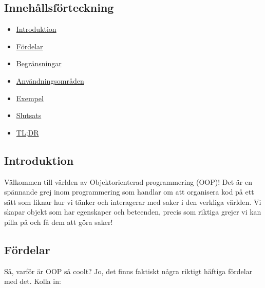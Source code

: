 \hypertarget{innehuxe5llsfuxf6rteckning}{%
\subsection{Innehållsförteckning}\label{innehuxe5llsfuxf6rteckning}}

\begin{itemize}
\tightlist
\item
  \protect\hyperlink{introduktion}{Introduktion}
\item
  \protect\hyperlink{fuxf6rdelar}{Fördelar}
\item
  \protect\hyperlink{begruxe4nsningar}{Begränsningar}
\item
  \protect\hyperlink{anvuxe4ndningsomruxe5den}{Användningsområden}
\item
  \protect\hyperlink{exempel}{Exempel}
\item
  \protect\hyperlink{slutsats}{Slutsats}
\item
  \protect\hyperlink{tldr}{TL;DR}
\end{itemize}

\hypertarget{introduktion}{%
\subsection{Introduktion}\label{introduktion}}

Välkommen till världen av Objektorienterad programmering (OOP)! Det är
en spännande grej inom programmering som handlar om att organisera kod
på ett sätt som liknar hur vi tänker och interagerar med saker i den
verkliga världen. Vi skapar objekt som har egenskaper och beteenden,
precis som riktiga grejer vi kan pilla på och få dem att göra saker!

\hypertarget{fuxf6rdelar}{%
\subsection{Fördelar}\label{fuxf6rdelar}}

Så, varför är OOP så coolt? Jo, det finns faktiskt några riktigt häftiga
fördelar med det. Kolla in:

